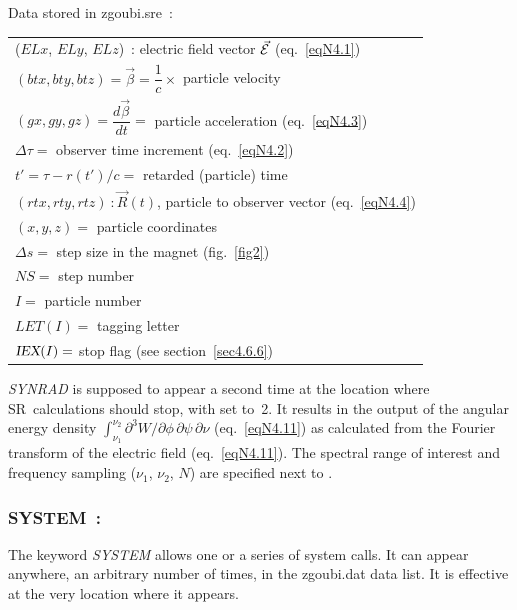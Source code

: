 \bigskip

\noindent Data stored in zgoubi.sre~:
 
 \begin{tabular}{l} 
 ($ELx$, $ELy$, $ELz$)~:  electric field vector $\vec{\mathcal{E}} $ 
 						(eq.~\ref{eqN4.1}) \\
 $(btx, bty, btz) = \vec\beta= \dfrac{1}{c} \times$ particle velocity \\
$(gx, gy, gz) = \dfrac{d\vec\beta}{dt} =$ particle acceleration (eq.~\ref{eqN4.3}) \\					
$\Delta \tau =$ observer time increment (eq.~\ref{eqN4.2}) \\
$t' = \tau  - r(t')/c = $ retarded (particle) time \\
$(rtx, rty, rtz)~: \vec R(t)$, particle to observer vector (eq.~\ref{eqN4.4}) \\
$(x, y, z) =$ particle coordinates\\
$\Delta s = $ step size in the magnet (fig.~\ref{fig2})\\
$NS=$ step number\\
$I=$ particle number\\
$LET(I)=$ tagging letter\\      \index{tag, tag character} 
$\IEX(I)\index{IEX@{\IEX}}=$ stop flag (see section~\ref{sec4.6.6}) 
\end{tabular}
\bigskip


\noindent\textsl{SYNRAD} is supposed to appear a second time at the 
location where SR~calculations should stop, with \textsl{\KSR} set 
to~2. It results in the output of the angular energy density 
$\int_{\nu_1}^{\nu_2} \partial^3 W / \partial \phi \, \partial \psi 
\, \partial \nu$ (eq.~\ref{eqN4.11}) as calculated from the Fourier transform 
of the electric field (eq.~\ref{eqN4.11}). The spectral range of 
interest and frequency sampling ($\nu_1$, $\nu_2$, $N$) are specified 
next to \textsl{\KSR}.
\bigskip



\newpage

\subsubsection*{SYSTEM~: \SYSTEMTitl}\label{SYSTEM}
\medskip 

\noindent The keyword \textsl{SYSTEM} allows one or a series of system calls. 
It can appear anywhere, an arbitrary number of times, 
 in the zgoubi.dat data list. It is effective at the very location where it appears. 

